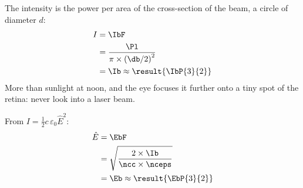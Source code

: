 \begin{abcliste}
\abc The intensity is the power per area of the cross-section of the beam, a circle of diameter $d$:
\begin{align}
 I &= \IbF \\
   &= \frac{\Pl}{\pi\times\left(\db/2\right)^2} \\
   &= \Ib \approx \result{\IbP{3}{2}}
\end{align}
More than sunlight at noon, and the eye focuses it further onto a tiny spot of the retina: never look into a laser beam.

\abc From $I = \frac{1}{2}c\,\varepsilon_0\hat E^2$:
\begin{align}
 \hat E &= \EbF \\
   &= \sqrt{\frac{2\times\Ib}{\ncc\times\nceps}} \\
   &= \Eb \approx \result{\EbP{3}{2}}
\end{align}
\end{abcliste}

